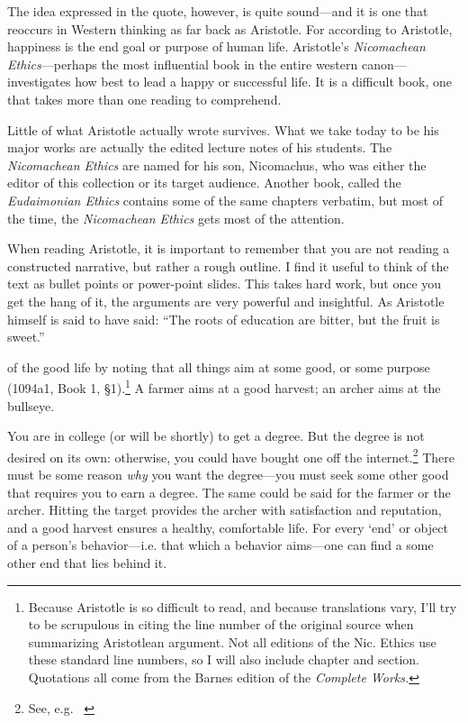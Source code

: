 The idea expressed in the quote, however, is quite sound---and it is one that reoccurs in Western thinking as far back as Aristotle. For according to Aristotle, happiness is the end goal or purpose of human life. Aristotle's \emph{Nicomachean Ethics}---perhaps the most influential book in the entire western canon---investigates how best to lead a happy or successful life. It is a difficult book, one that takes more than one reading to comprehend. 

\begin{question}Little of what Aristotle actually wrote survives. What we take today to be his major works are actually the edited lecture notes of his students. The \emph{Nicomachean Ethics} are named for his son, Nicomachus, who was either the editor of this collection or its target audience. Another book, called the \emph{Eudaimonian Ethics} contains some of the same chapters verbatim, but most of the time, the \emph{Nicomachean Ethics} gets most of the attention.

When reading Aristotle, it is important to remember that you are not reading a constructed narrative, but rather a rough outline. I find it useful to think of the text as bullet points or power-point slides. This takes hard work, but once you get the hang of it, the arguments are very powerful and insightful. As Aristotle himself is said to have said: ``The roots of education are bitter, but the fruit is sweet.'' ~\citep[p. 461]{Laertius:eqeg5o3J}\end{question}

 of the good life by noting that all things aim at some good, or some purpose (1094a1, Book 1, \S1).\footnote{Because Aristotle is so difficult to read, and because translations vary, I'll try to be scrupulous in citing the line number of the original source when summarizing Aristotlean argument. Not all editions of the Nic. Ethics use these standard line numbers, so I will also include chapter and section. Quotations all come from the Barnes edition of the \emph{Complete Works.}} A farmer aims at a good harvest; an archer aims at the bullseye. 

You are in college (or will be shortly) to get a degree. But the degree is not desired on its own: otherwise, you could have bought one off the internet.\footnote{See, e.g. ~\citep{Dunn:2017wm}} There must be some reason \emph{why} you want the degree---you must seek some other good that requires you to earn a degree. The same could be said for the farmer or the archer. Hitting the target provides the archer with satisfaction and reputation, and a good harvest ensures a healthy, comfortable life. For every `end' or object of a person's behavior---i.e. that which a behavior aims---one can find a some other end that lies behind it.

